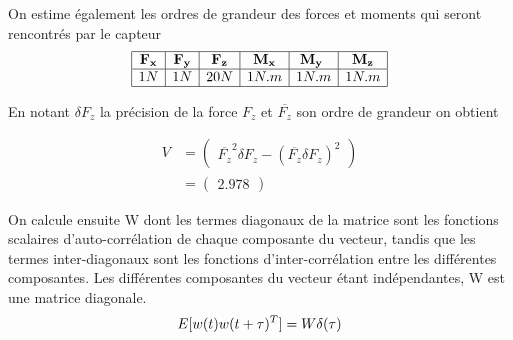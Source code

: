 \documentclass[12pt,twoside,a4paper]{article}
\begin{document}
On estime également les ordres de grandeur des forces et moments qui seront rencontrés par le capteur 
$$
\begin{array}{|c|c|c|c|c|c|}	
	\hline
	\bold{F_x} & \bold{F_y} & \bold{F_z} & \bold{M_x} & \bold{M_y} & \bold{M_z} \\
	\hline 
	1N & 1N & 20N & 1N.m & 1N.m & 1N.m \\
	\hline
\end{array}
$$

En notant $\delta F_z$ la précision de la force $F_z$ et $\overline{F_z}$ son ordre de grandeur on obtient

\hspace{-3mm}

\begin{align*}
V &= \begin{pmatrix}
\overline{F_z}^2\delta{F_z} - (\overline{F_z}\delta{F_z})^2
\end{pmatrix} \\
&=  \begin{pmatrix}
2.978
\end{pmatrix}
\end{align*}




\vspace{2cm}

On calcule ensuite W dont les termes diagonaux de la matrice sont les fonctions scalaires d'auto-corrélation de chaque composante du vecteur, tandis que les termes inter-diagonaux sont les fonctions d'inter-corrélation entre les différentes composantes. Les différentes composantes du vecteur étant indépendantes, W est une matrice diagonale.
$$
E[w(t) w(t+\tau)^T ] = W \delta(\tau) \\
$$
\end{document}
